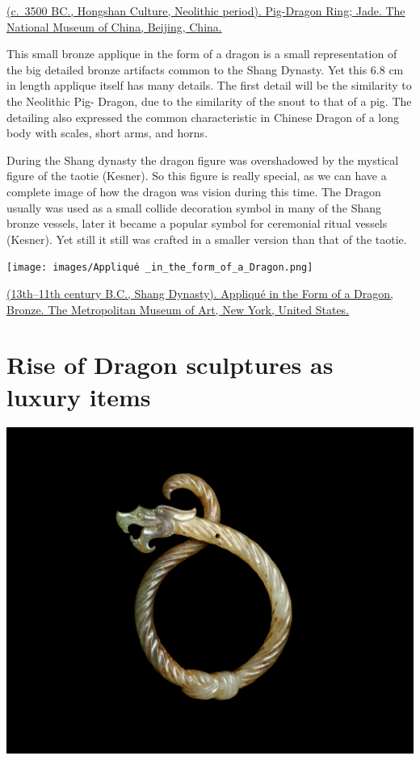\documentclass[
]{book}
\begin{document}
\href{}{(c.~3500 BC., Hongshan Culture, Neolithic period). Pig-Dragon Ring; Jade. The National Museum of China, Beijing, China.}

This small bronze applique in the form of a dragon is a small representation of the big detailed bronze artifacts common to the Shang Dynasty. Yet this 6.8 cm in length applique itself has many details. The first detail will be the similarity to the Neolithic Pig- Dragon, due to the similarity of the snout to that of a pig. The detailing also expressed the common characteristic in Chinese Dragon of a long body with scales, short arms, and horns.

During the Shang dynasty the dragon figure was overshadowed by the mystical figure of the taotie (Kesner). So this figure is really special, as we can have a complete image of how the dragon was vision during this time. The Dragon usually was used as a small collide decoration symbol in many of the Shang bronze vessels, later it became a popular symbol for ceremonial ritual vessels (Kesner). Yet still it still was crafted in a smaller version than that of the taotie.

\texttt{[image: images/Appliqué \_in\_the\_form\_of\_a\_Dragon.png]}

\href{https://www.metmuseum.org/art/collection/search/49505}{(13th--11th century B.C., Shang Dynasty). Appliqué in the Form of a Dragon, Bronze. The Metropolitan Museum of Art, New York, United States.}

\hypertarget{zhou_han}{%
\chapter*{Rise of Dragon sculptures as luxury items}\label{zhou_han}}

\includegraphics{images/knotted_dragon.jpg}
\end{document}
